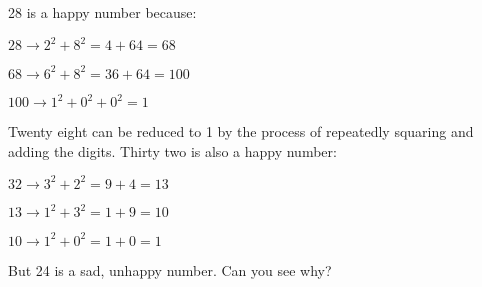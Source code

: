 28 is a happy number because:
\par
$28 \rightarrow 2^2 + 8^2 =  4 + 64 = 68$   
\par
$68 \rightarrow 6^2 + 8^2 = 36 + 64 = 100$
\par
$100 \rightarrow 1^2 + 0^2 + 0^2 = 1$
\par
Twenty eight can be reduced to 1 by the process of repeatedly squaring and adding 
the digits.
Thirty two is also a happy number:
\par
$32 \rightarrow 3^2 + 2^2 = 9 + 4 = 13$
\par
$13 \rightarrow 1^2 + 3^2 = 1 + 9 = 10$
\par
$10 \rightarrow 1^2 + 0^2 = 1 + 0 = 1$
\par
	But  24 is a sad, unhappy number. Can you see why?